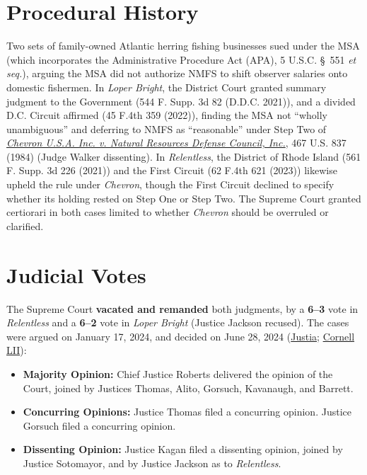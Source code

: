 \documentclass[12pt]{article}
\begin{document}
\section{Procedural History}
Two sets of family-owned Atlantic herring fishing businesses sued under the MSA (which incorporates the Administrative Procedure Act (APA), 5 U.S.C. \S~551 \textit{et seq.}), arguing the MSA did not authorize NMFS to shift observer salaries onto domestic fishermen. In \textit{Loper Bright}, the District Court granted summary judgment to the Government (544 F. Supp. 3d 82 (D.D.C. 2021)), and a divided D.C. Circuit affirmed (45 F.4th 359 (2022)), finding the MSA not ``wholly unambiguous'' and deferring to NMFS as ``reasonable'' under Step Two of \href{https://supreme.justia.com/cases/federal/us/467/837/}{\textit{Chevron U.S.A. Inc. v. Natural Resources Defense Council, Inc.}}, 467 U.S. 837 (1984) (Judge Walker dissenting). In \textit{Relentless}, the District of Rhode Island (561 F. Supp. 3d 226 (2021)) and the First Circuit (62 F.4th 621 (2023)) likewise upheld the rule under \textit{Chevron}, though the First Circuit declined to specify whether its holding rested on Step One or Step Two. The Supreme Court granted certiorari in both cases limited to whether \textit{Chevron} should be overruled or clarified.

\section{Judicial Votes}
The Supreme Court \textbf{vacated and remanded} both judgments, by a \textbf{6--3} vote in \textit{Relentless} and a \textbf{6--2} vote in \textit{Loper Bright} (Justice Jackson recused). The cases were argued on January 17, 2024, and decided on June 28, 2024 (\href{https://supreme.justia.com/cases/federal/us/603/22-451/}{Justia}; \href{https://www.law.cornell.edu/supremecourt/text/22-451}{Cornell LII}):

\begin{itemize}
    \item \textbf{Majority Opinion:} Chief Justice Roberts delivered the opinion of the Court, joined by Justices Thomas, Alito, Gorsuch, Kavanaugh, and Barrett.
    \item \textbf{Concurring Opinions:} Justice Thomas filed a concurring opinion. Justice Gorsuch filed a concurring opinion.
    \item \textbf{Dissenting Opinion:} Justice Kagan filed a dissenting opinion, joined by Justice Sotomayor, and by Justice Jackson as to \textit{Relentless}.
\end{itemize}
\end{document}
